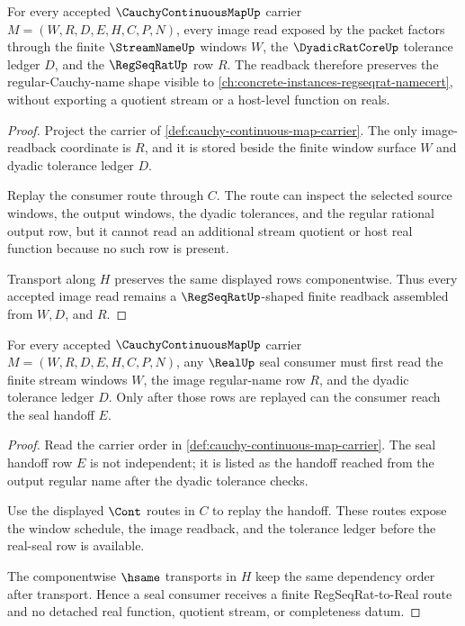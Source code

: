\begin{theorem}
\label{thm:cauchy-continuous-map-regseqrat-image}
For every accepted $\CauchyContinuousMapUp$ carrier $M=(W,R,D,E,H,C,P,N)$, every image read exposed by the packet factors through the finite $\StreamNameUp$ windows $W$, the $\DyadicRatCoreUp$ tolerance ledger $D$, and the $\RegSeqRatUp$ row $R$. The readback therefore preserves the regular-Cauchy-name shape visible to \autoref{ch:concrete-instances-regseqrat-namecert}, without exporting a quotient stream or a host-level function on reals.
\end{theorem}
\begin{proof}
Project the carrier of \autoref{def:cauchy-continuous-map-carrier}. The only image-readback coordinate is $R$, and it is stored beside the finite window surface $W$ and dyadic tolerance ledger $D$.

Replay the consumer route through $C$. The route can inspect the selected source windows, the output windows, the dyadic tolerances, and the regular rational output row, but it cannot read an additional stream quotient or host real function because no such row is present.

Transport along $H$ preserves the same displayed rows componentwise. Thus every accepted image read remains a $\RegSeqRatUp$-shaped finite readback assembled from $W,D$, and $R$.
\end{proof}

\begin{theorem}
\label{thm:cauchy-continuous-map-real-seal-handoff}
For every accepted $\CauchyContinuousMapUp$ carrier $M=(W,R,D,E,H,C,P,N)$, any $\RealUp$ seal consumer must first read the finite stream windows $W$, the image regular-name row $R$, and the dyadic tolerance ledger $D$. Only after those rows are replayed can the consumer reach the seal handoff $E$.
\end{theorem}
\begin{proof}
Read the carrier order in \autoref{def:cauchy-continuous-map-carrier}. The seal handoff row $E$ is not independent; it is listed as the handoff reached from the output regular name after the dyadic tolerance checks.

Use the displayed $\Cont$ routes in $C$ to replay the handoff. These routes expose the window schedule, the image readback, and the tolerance ledger before the real-seal row is available.

The componentwise $\hsame$ transports in $H$ keep the same dependency order after transport. Hence a seal consumer receives a finite RegSeqRat-to-Real route and no detached real function, quotient stream, or completeness datum.
\end{proof}

